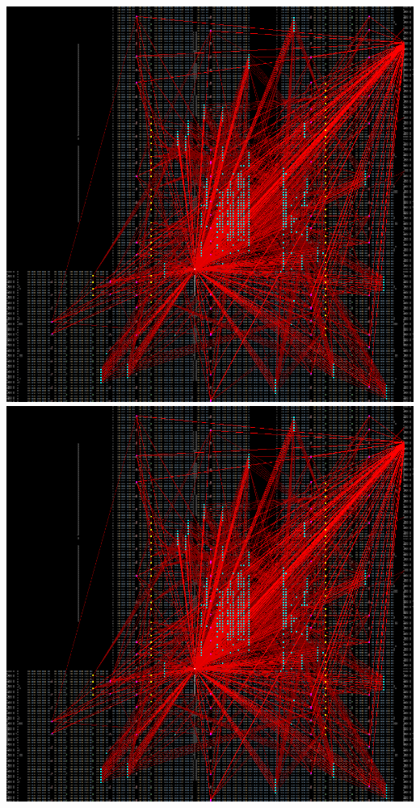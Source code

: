 {    \includegraphics[valign=t, scale=0.13]{figures/results/PlacerAnnealMidpoint/00000100.png}
    \includegraphics[valign=t, scale=0.13]{figures/results/PlacerAnnealMidpoint/00000299.png}
    \label{fig:PAMSnapshots}
}

